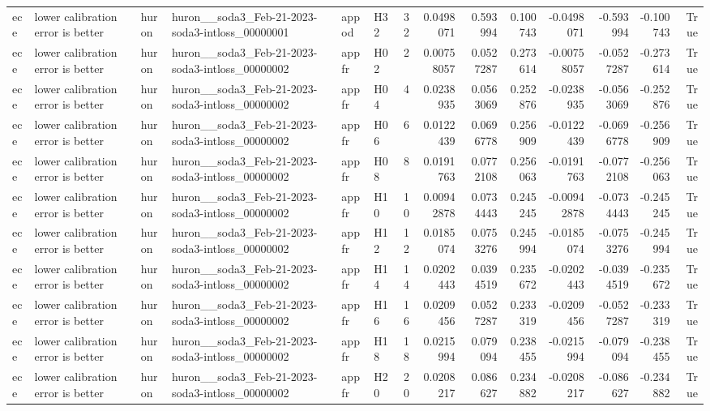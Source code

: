 \begin{longtable}{llllllrrrrrrrr}
ece & lower calibration error is better & huron & huron\_\_soda3\_Feb-21-2023-soda3-intloss\_00000001 & appod & H32 & 32 & 0.0498071 & 0.593994 & 0.100743 & -0.0498071 & -0.593994 & -0.100743 & True \\
ece & lower calibration error is better & huron & huron\_\_soda3\_Feb-21-2023-soda3-intloss\_00000002 & appfr & H02 & 2 & 0.00758057 & 0.0527287 & 0.273614 & -0.00758057 & -0.0527287 & -0.273614 & True \\
ece & lower calibration error is better & huron & huron\_\_soda3\_Feb-21-2023-soda3-intloss\_00000002 & appfr & H04 & 4 & 0.0238935 & 0.0563069 & 0.252876 & -0.0238935 & -0.0563069 & -0.252876 & True \\
ece & lower calibration error is better & huron & huron\_\_soda3\_Feb-21-2023-soda3-intloss\_00000002 & appfr & H06 & 6 & 0.0122439 & 0.0696778 & 0.256909 & -0.0122439 & -0.0696778 & -0.256909 & True \\
ece & lower calibration error is better & huron & huron\_\_soda3\_Feb-21-2023-soda3-intloss\_00000002 & appfr & H08 & 8 & 0.0191763 & 0.0772108 & 0.256063 & -0.0191763 & -0.0772108 & -0.256063 & True \\
ece & lower calibration error is better & huron & huron\_\_soda3\_Feb-21-2023-soda3-intloss\_00000002 & appfr & H10 & 10 & 0.00942878 & 0.0734443 & 0.245245 & -0.00942878 & -0.0734443 & -0.245245 & True \\
ece & lower calibration error is better & huron & huron\_\_soda3\_Feb-21-2023-soda3-intloss\_00000002 & appfr & H12 & 12 & 0.0185074 & 0.0753276 & 0.245994 & -0.0185074 & -0.0753276 & -0.245994 & True \\
ece & lower calibration error is better & huron & huron\_\_soda3\_Feb-21-2023-soda3-intloss\_00000002 & appfr & H14 & 14 & 0.0202443 & 0.0394519 & 0.235672 & -0.0202443 & -0.0394519 & -0.235672 & True \\
ece & lower calibration error is better & huron & huron\_\_soda3\_Feb-21-2023-soda3-intloss\_00000002 & appfr & H16 & 16 & 0.0209456 & 0.0527287 & 0.233319 & -0.0209456 & -0.0527287 & -0.233319 & True \\
ece & lower calibration error is better & huron & huron\_\_soda3\_Feb-21-2023-soda3-intloss\_00000002 & appfr & H18 & 18 & 0.0215994 & 0.079094 & 0.238455 & -0.0215994 & -0.079094 & -0.238455 & True \\
ece & lower calibration error is better & huron & huron\_\_soda3\_Feb-21-2023-soda3-intloss\_00000002 & appfr & H20 & 20 & 0.0208217 & 0.086627 & 0.234882 & -0.0208217 & -0.086627 & -0.234882 & True \\

\end{longtable}
